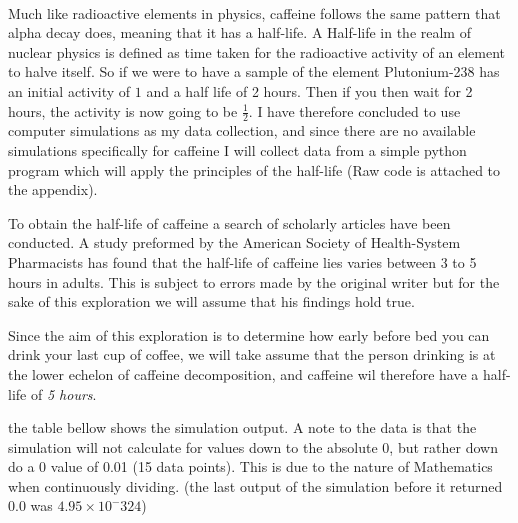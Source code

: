 \documentclass[12pt]{article}
\begin{document}
        \paragraph{}
                Much like radioactive elements in physics, caffeine follows the same pattern that alpha decay does, meaning that it has a half-life. A Half-life in the realm of nuclear physics is defined as time taken for the radioactive activity of an element to halve itself. So if we were to have a sample of the element Plutonium-238 has an initial activity of $1$ and a half life of 2 hours. Then if you then wait for 2 hours, the activity is now going to be {$\frac{1}{2}$}. I have therefore concluded to use computer simulations as my data collection, and since there are no available simulations specifically for caffeine I will collect data from a simple python program which will apply the principles of the half-life (Raw code is attached to the appendix). 

                \noindent To obtain the half-life of caffeine a search of scholarly articles have been conducted. A study preformed by the American Society of Health-System Pharmacists has found that the half-life of caffeine lies varies between 3 to 5 hours in adults. 
                This is subject to errors made by the original writer but for the sake of this exploration we will assume that his findings hold true. 
                
                \noindent
                Since the aim of this exploration is  to determine how early before bed you can drink your last cup of coffee, we will take assume that the person drinking is at the lower echelon of caffeine decomposition, and caffeine wil therefore have a half-life of \textit{5 hours}. 
                
                \noindent the table bellow shows the simulation output. A note to the data is that the simulation will not calculate for values down to the absolute 0, but rather down do a 0 value of 0.01 (15 data points). This is due to the nature of Mathematics when continuously dividing. (the last output of the simulation before it returned 0.0 was $4.95\times 10^-324$)
\end{document}
